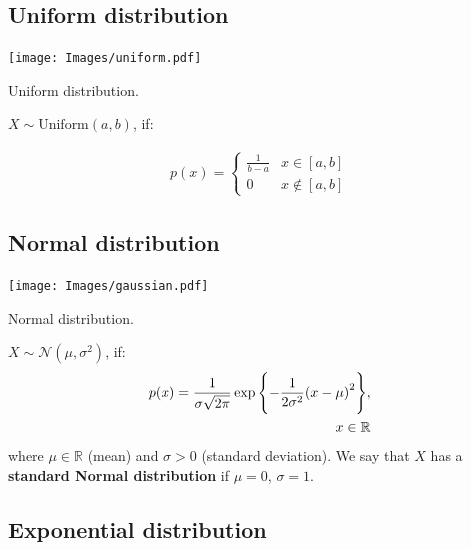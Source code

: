 \documentclass[
  letterpaper,
  12pt,
  british]{tufte-book}
\theoremstyle{plain}
\theoremstyle{definition}
\theoremstyle{plain}
\theoremstyle{remark}
\begin{document}
\hypertarget{sec-uniform_distribution}{%
\subsection{Uniform distribution}\label{sec-uniform_distribution}}

\begin{marginfigure}

{\centering \texttt{[image: Images/uniform.pdf]}

}

\caption{\label{fig-uniform_distribution}Uniform distribution.}

\end{marginfigure}

\(\mathit{X}\sim \text{Uniform}(a,b)\), if:

\begin{align}
    p(\mathit{x})=
    \begin{cases}
        \frac{1}{b-a} & x \in [a,b]\\
        0 & \mathit{x}\notin [a,b]
    \end{cases}
\end{align}

\hypertarget{normal-distribution}{%
\subsection{Normal distribution}\label{normal-distribution}}

\begin{marginfigure}

{\centering \texttt{[image: Images/gaussian.pdf]}

}

\caption{\label{fig-normal_distribution}Normal distribution.}

\end{marginfigure}

\(\mathit{X}\sim \mathcal{N}(\mu, \sigma^2)\), if: \begin{align}
    p(\mathit{x})=\frac{1}{\sigma \sqrt{2\pi}}\exp{\Biggl{\{}{-\frac{1}{2\sigma^2}{(x-\mu)}^2}\Biggr{\}}}, \\~x \in \mathbb{R}\\
\end{align} where \(\mu \in \mathbb{R}\) (mean) and \(\sigma > 0\)
(standard deviation). We say that \(\mathit{X}\) has a \textbf{standard
Normal distribution} if \(\mu = 0\), \(\sigma =1\).

\hypertarget{exponential-distribution}{%
\subsection{Exponential distribution}\label{exponential-distribution}}
\end{document}
